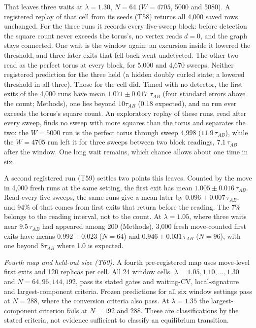 \documentclass[aps,pre,10pt,twocolumn,superscriptaddress,nofootinbib]{revtex4-2}
\begin{document}
That leaves three waits at $\lambda=1.30$, $N=64$ ($W=4705$, 5000 and 5080). A registered replay of
that cell from its seeds (T58) returns all 4,000 saved rows unchanged. For the three runs it records
every five-sweep block: before detection the square count never exceeds the torus's, no vertex reads
$d=0$, and the graph stays connected. One wait is the window again: an excursion inside it lowered
the threshold, and three later exits that fell back went undetected. The other two read as the
perfect torus at every block, for 5,000 and 4,670 sweeps. Neither registered prediction for the
three held (a hidden doubly curled state; a lowered threshold in all three). Those for the cell did.
Timed with no detector, the
first exits of the 4,000 runs have mean $1.071\pm0.017$ $\tau_{AB}$ (four standard errors above the
count; Methods), one lies beyond $10\tau_{AB}$ (0.18 expected), and no run ever exceeds the torus's
square count. An exploratory replay of these runs, read after every sweep, finds no sweep with more
squares than the torus and separates the two: the $W=5000$ run is the perfect torus through sweep
4,998 ($11.9\,\tau_{AB}$), while the $W=4705$ run left it for three sweeps between two block
readings, $7.1\,\tau_{AB}$ after the window. One long wait remains, which chance allows about one
time in six.

A second registered run (T59) settles two points this leaves. Counted by the move in 4,000 fresh runs
at the same setting, the first exit has mean $1.005\pm0.016\,\tau_{AB}$. Read every five sweeps, the
same runs give a mean later by $0.096\pm0.007\,\tau_{AB}$, and 94\% of that comes from first exits
that return before the reading. The 7\% belongs to the reading interval, not to the count. At
$\lambda=1.05$, where three waits near $9.5\,\tau_{AB}$ had appeared among 200 (Methods), 3,000 fresh
move-counted first exits have means $0.992\pm0.023$ ($N=64$) and $0.946\pm0.031\,\tau_{AB}$ ($N=96$),
with one beyond $8\tau_{AB}$ where 1.0 is expected.

\emph{Fourth map and held-out size (T60).}
A fourth pre-registered map uses move-level first exits and 120 replicas per cell. All 24
window cells, $\lambda=1.05,1.10,\ldots,1.30$ and $N=64,96,144,192$, pass its stated gates and
waiting-CV, local-signature and largest-component criteria. Frozen predictions for all six
window settings pass at $N=288$, where the conversion criteria also pass. At $\lambda=1.35$
the largest-component criterion fails at $N=192$ and 288. These are classifications by the stated criteria,
not evidence sufficient to classify an equilibrium transition.
\end{document}
